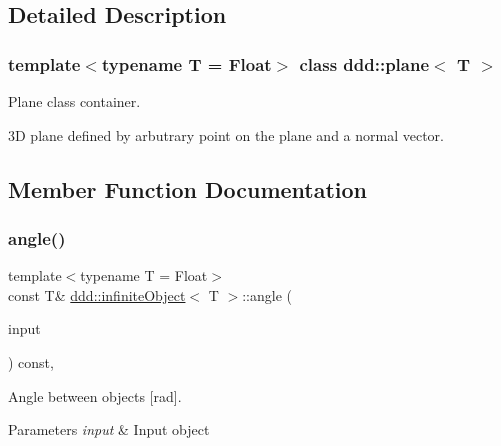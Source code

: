 \subsection{Detailed Description}
\subsubsection*{template$<$typename T = Float$>$\newline
class ddd\+::plane$<$ T $>$}

Plane class container. 

3D plane defined by arbutrary point on the plane and a normal vector. 

\subsection{Member Function Documentation}
\mbox{\label{classddd_1_1infinite_object_a2145eca21c4505c11d19badc25faaf85}} 
\subsubsection{\texorpdfstring{angle()}{angle()}}
{\footnotesize\ttfamily template$<$typename T = Float$>$ \\
const T\& \hyperlink{classddd_1_1infinite_object}{ddd\+::infinite\+Object}$<$ T $>$\+::angle (\begin{DoxyParamCaption}\item[{const \hyperlink{classddd_1_1infinite_object}{infinite\+Object}$<$ T $>$ \&}]{input }\end{DoxyParamCaption}) const\hspace{0.3cm}{\ttfamily [inline]}, {\ttfamily [inherited]}}



Angle between objects \mbox{[}rad\mbox{]}. 


\begin{DoxyParams}{Parameters}
{\em input} & Input object \\
\hline
\end{DoxyParams}
\mbox{\label{classddd_1_1infinite_object_a1940ac3d87fc2ca742ca036c866736e8}} 
